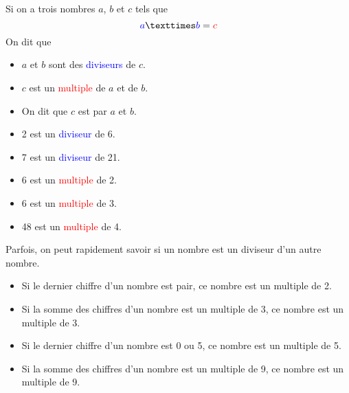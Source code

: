 \documentclass[../€Cours-complet/Cours-complet]{subfiles}
\begin{document}
\maketitle

\begin{cours}
	Si on a trois nombres $a$, $b$ et $c$ tels que
	$$ \textcolor{blue}{a} × \textcolor{blue}{b} = \textcolor{red}{c} $$
	On dit que
	\begin{itemize}
		\setlength\itemsep{0.3em}
		\item $a$ et $b$ sont des \textcolor{blue}{diviseurs} de $c$.
		\item $c$ est un \textcolor{red}{multiple} de $a$ et de $b$.
		\item On dit que $c$ est  par $a$ et $b$.
	\end{itemize}
\end{cours}

\begin{exemple}
	\begin{itemize}
		\setlength\itemsep{0.3em}
		\item 2 est un \textcolor{blue}{diviseur} de 6.
		\item 7 est un \textcolor{blue}{diviseur} de 21.
		\item 6 est un \textcolor{red}{multiple} de 2.
		\item 6 est un \textcolor{red}{multiple} de 3.
		\item 48 est un \textcolor{red}{multiple} de 4.
	\end{itemize}
\end{exemple}

\begin{cours} \label{cours:criteres-de-divisibilite}
	Parfois, on peut rapidement savoir si un nombre est un diviseur d'un autre nombre. \\
	\begin{itemize}
		\setlength\itemsep{0.3em}
		\item Si le dernier chiffre d'un nombre est pair, ce nombre est un multiple de 2.
		\item Si la somme des chiffres d'un nombre est un multiple de 3, ce nombre est un multiple de 3.
		\item Si le dernier chiffre d'un nombre est 0 ou 5, ce nombre est un multiple de 5.
		\item Si la somme des chiffres d'un nombre est un multiple de 9, ce nombre est un multiple de 9.
	\end{itemize}
\end{cours}
\end{document}
